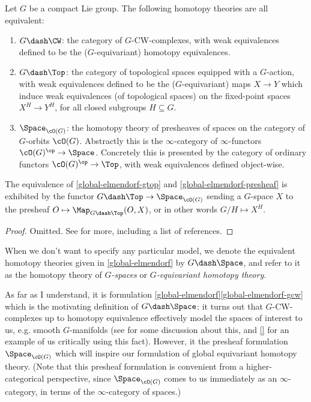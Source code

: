 \begin{theorem}[Elmendorf]
  \label{global-elmendorf}
  Let $G$ be a compact Lie group. The following homotopy theories are
  all equivalent:
  \begin{enumerate}
  \item \label{global-elmendorf-gcw} $G\dash\CW$: the category of
    $G$-CW-complexes, with weak equivalences defined to be the
    ($G$-equivariant) homotopy equivalences.
  \item \label{global-elmendorf-gtop} $G\dash\Top$: the category of
    topological spaces equipped with a $G$-action, with weak
    equivalences defined to be the ($G$-equivariant) maps $X \to Y$
    which induce weak equivalences (of topological spaces) on the
    fixed-point spaces $X^H \to Y^H$, for all closed subgroups
    $H \subseteq G$.
  \item \label{global-elmendorf-presheaf} $\Space_{\cO(G)}$: the
    homotopy theory of presheaves of spaces on the category of
    $G$-orbits $\cO(G)$. Abstractly this is the $\infty$-category of
    $\infty$-functors $\cO(G)^\op \to \Space$. Concretely this is
    presented by the category of ordinary functors
    $\cO(G)^\op \to \Top$, with weak equivalences defined object-wise.
  \end{enumerate}
  The equivalence of \cref{global-elmendorf-gtop} and
  \cref{global-elmendorf-presheaf} is exhibited by the functor
  $G\dash\Top \to \Space_{\cO(G)}$ sending a $G$-space $X$ to the
  presheaf $O \mapsto \Map_{G\dash\Top}(O,X)$, or in other words
  $G/H \mapsto X^H$.
\end{theorem}

\begin{proof}
  Omitted. See \cite{nlab-equivhomotopy} for more, including a list of
  references.
\end{proof}

\begin{notation}
  \label{global-gspace}
  When we don't want to specify any particular model, we denote the
  equivalent homotopy theories given in \cref{global-elmendorf} by
  $G\dash\Space$, and refer to it as the homotopy theory of
  \emph{$G$-spaces} or \emph{$G$-equivariant homotopy theory}.
\end{notation}

As far as I understand, it is formulation
\cref{global-elmendorf}\cref{global-elmendorf-gcw} which is the
motivating definition of $G\dash\Space$: it turns out that
$G$-CW-complexes up to homotopy equivalence effectively model the
spaces of interest to us, e.g. smooth $G$-manifolds (see
\cite{mo-equivhmptygrps} for some discussion about this, and \ref{}
for an example of us critically using this fact). However, it the
presheaf formulation $\Space_{\cO(G)}$ which will inspire our
formulation of global equivariant homotopy theory. (Note that this
presheaf formulation is convenient from a higher-categorical
perspective, since $\Space_{\cO(G)}$ comes to us immediately as an
$\infty$-category, in terms of the $\infty$-category of spaces.)

